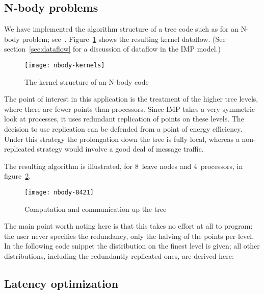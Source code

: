 \documentclass[11pt,fleqn,preprint]{impreport}
\begin{document}
\subsection{N-body problems}
\label{sec:nbody}

We have implemented the algorithm structure of a tree code such as for an N-body problem;
see~\cite{Salmon86fastparallel}. 
Figure~\ref{fig:nbody-kernels} shows the resulting kernel dataflow.
(See section~\ref{sec:dataflow} for a discussion of dataflow in the IMP model.)

\begin{figure}[p]
  \texttt{[image: nbody-kernels]}
  \caption{The kernel structure of an N-body code}
  \label{fig:nbody-kernels}
\end{figure}


The point of interest in this application is the treatment of the
higher tree levels, where there are fewer points than
processors. Since IMP takes a very symmetric look at processes, it
uses redundant replication of points on these levels.
The decision to use replication can be defended from a point of energy efficiency.
Under this strategy the prolongation down the tree is fully local, whereas
a non-replicated strategy would involve a good deal of message traffic.

The resulting
algorithm is illustrated, for 8~leave nodes and 4~processors, in
figure~\ref{fig:uptree}.

\begin{figure}[ht]
  \texttt{[image: nbody-8421]}
  \caption{Computation and communication up the tree}
  \label{fig:uptree}
\end{figure}

The main point worth noting here
is that this takes no effort at all to program: the user never specifies the redundancy, only
the halving of the points per level. In the following code snippet the distribution
 on the finest level is given; all other distributions, including the redundantly
replicated ones, are derived here:


\subsection{Latency optimization}
\end{document}

